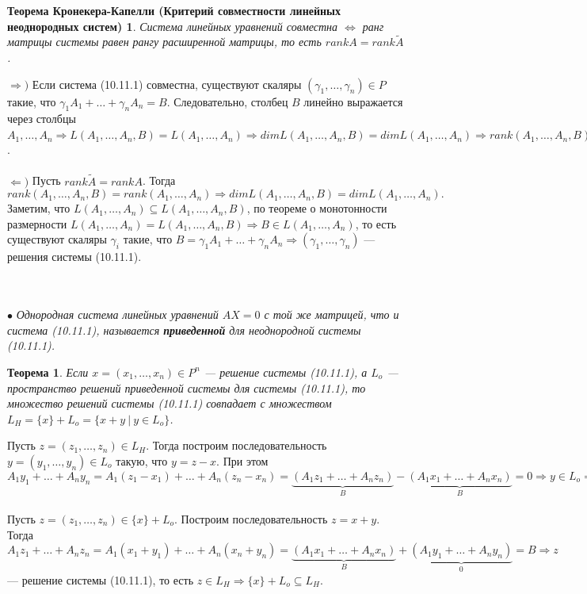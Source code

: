 \newtheorem*{th10_11_1}{Теорема Кронекера-Капелли (Критерий совместности линейных неоднородных систем)}\begin{th10_11_1}
	Система линейных уравнений совместна $\Longleftrightarrow$ ранг матрицы системы равен рангу расширенной матрицы, то есть $rank A = rank\widetilde{A}$.
\end{th10_11_1}\begin{Proof}
	$\Rightarrow)$ Если система (10.11.1) совместна, существуют скаляры $(\gamma_1,\dots,\gamma_n)\in P$ такие, что $\gamma_1 A_1 + \ldots + \gamma_n A_n = B$. Следовательно, столбец $B$ линейно выражается через столбцы $A_1,\dots,A_n \Rightarrow L(A_1,\dots,A_n,B) =L(A_1,\dots,A_n) \Rightarrow dimL(A_1,\dots,A_n,B) = dimL(A_1,\dots,A_n)\Rightarrow rank(A_1,\dots,A_n,B) = rank(A_1,\dots,A_n) \Rightarrow rank\widetilde{A} =rank A$.\\\\
	$\Leftarrow)$ Пусть $rank\widetilde{A} =rank A$. Тогда $ rank(A_1,\dots,A_n,B) = rank(A_1,\dots,A_n) \Rightarrow dimL(A_1,\dots,A_n,B) = dimL(A_1,\dots,A_n).$ Заметим, что $L(A_1,\dots,A_n) \subseteq L(A_1, \dots, A_n, B)$, по теореме о монотонности размерности $L(A_1,\dots,A_n)=L(A_1, \dots, A_n, B) \Rightarrow B \in L(A_1,\dots,A_n)$, то есть существуют скаляры $\gamma_i$ такие, что $B =  \gamma_1 A_1 + \ldots + \gamma_n A_n \Rightarrow (\gamma_1,\dots,\gamma_n)$ --- решения системы (10.11.1).
\end{Proof}\\\\
$\bullet$ \textit{Однородная система линейных уравнений $AX = 0$ с той же матрицей, что и система (10.11.1), называется \textbf{приведенной} для неоднородной системы (10.11.1).}
\newtheorem*{th10_11_2}{Теорема}\begin{th10_11_2}Если $x = (x_1,\dots,x_n)\in P^n$ --- решение системы  (10.11.1), а $L_o$ --- пространство решений приведенной системы для системы (10.11.1), то множество решений системы (10.11.1) совпадает с множеством $L_H = \{x\} + L_o = \{ x + y \ | \ y\in L_o \}$.
\end{th10_11_2}\begin{Proof}
	Пусть $z = (z_1,\dots, z_n)\in L_H$. Тогда построим последовательность $y = (y_1,\dots, y_n) \in L_o$ такую, что $y = z - x$. При этом $A_1y_1 + \ldots + A_n y_n = A_1(z_1 - x_1) + \ldots + A_n(z_n - x_n) = \underbrace{ (A_1z_1 + \ldots + A_nz_n) }_{B} - \underbrace{ (A_1x_1 + \ldots + A_nx_n) }_{B} = 0 \Rightarrow y\in L_o \Rightarrow z = x + y\Rightarrow L_H \subseteq \{x\} + L_o.$\\\\
	Пусть $z=(z_1,\dots,z_n)\in \{x\} +L_o$. Построим последовательность $z = x+y$. Тогда $A_1z_1 +\dots +A_nz_n = A_1(x_1 + y_1) + \ldots + A_n(x_n + y_n)=\underbrace{(A_1 x_1 + \ldots + A_n x_n)}_{B} + \underbrace{(A_1 y_1 + \ldots + A_n y_n)}_{0} = B\Rightarrow z$ --- решение системы (10.11.1), то есть $z \in L_H\Rightarrow \{x\} + L_o \subseteq L_H$.
\end{Proof}

